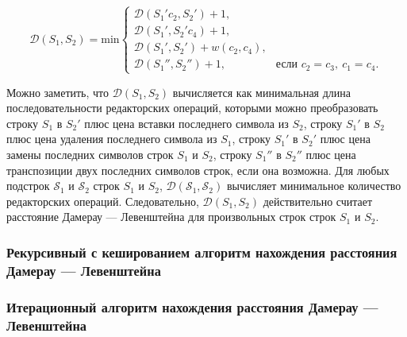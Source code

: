 \begin{enumerate}
$$    \mathcal{D}(S_1, S_2) = \mathrm{min} \begin{cases}
        \mathcal{D}(S_1'c_2, S_2') + 1, \\
        \mathcal{D}(S_1', S_2'c_4) + 1, \\
        \mathcal{D}(S_1', S_2') + w(c_2, c_4), \\
        \mathcal{D}(S_1'', S_2'') + 1,\ &\text{если $c_2 = c_3,\ c_1 = c_4$}.
    \end{cases}
        $$
\end{enumerate}

Можно заметить, что $\mathcal{D}(S_1, S_2)$ вычисляется как минимальная длина последовательности редакторских операций, которыми можно преобразовать строку $S_1$ в $S_2'$ плюс цена вставки последнего символа из $S_2$, строку $S_1'$ в $S_2$ плюс цена удаления последнего символа из $S_1$, строку $S_1'$ в $S_2'$ плюс цена замены последних символов строк $S_1$ и $S_2$, строку $S_1''$ в $S_2''$ плюс цена транспозиции двух последних символов строк, если она возможна.
Для любых подстрок $\mathcal{S}_1$ и $\mathcal{S}_2$ строк $S_1$ и $S_2$, $\mathcal{D}(\mathcal{S}_1, \mathcal{S}_2)$ вычисляет минимальное количество редакторских операций.
Следовательно, $\mathcal{D}(S_1, S_2)$ действительно считает расстояние Дамерау --- Левенштейна для произвольных строк строк $S_1$ и $S_2$.

\subsubsection{Рекурсивный с кешированием алгоритм нахождения расстояния Дамерау --- Левенштейна}

\subsubsection{Итерационный алгоритм нахождения расстояния Дамерау --- Левенштейна}
